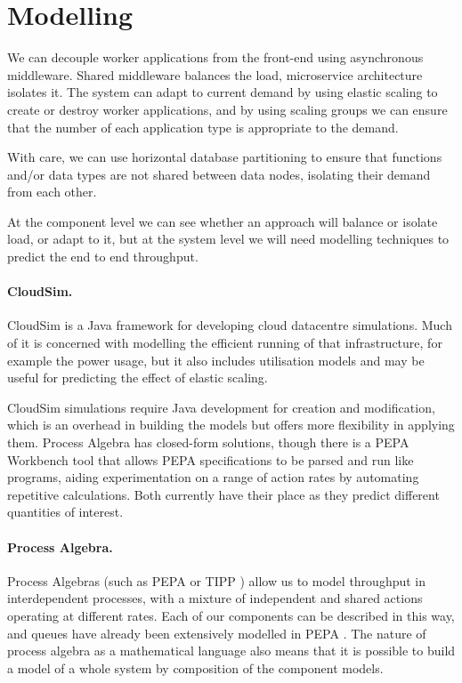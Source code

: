 \section{Modelling}

We can decouple worker applications from the front-end using asynchronous middleware.  Shared middleware balances the load, microservice architecture isolates it.  The system can adapt to current demand by using elastic scaling to create or destroy worker applications, and by using scaling groups we can ensure that the number of each application type is appropriate to the demand.

With care, we can use horizontal database partitioning to ensure that functions and/or data types are not shared between data nodes, isolating their demand from each other.

At the component level we can see whether an approach will balance or isolate load, or adapt to it, but at the system level we will need modelling techniques to predict the end to end throughput.

\paragraph{CloudSim.}  CloudSim \cite{calheiros2011cloudsim} is a Java framework for developing cloud datacentre simulations.  Much of it is concerned with modelling the efficient running of that infrastructure, for example the power usage, but it also includes utilisation models and may be useful for predicting the effect of elastic scaling.

CloudSim simulations require Java development for creation and modification, which is an overhead in building the models but offers more flexibility in applying them.  Process Algebra has closed-form solutions, though there is a PEPA Workbench tool \cite{gilmore1994pepa} that allows PEPA specifications to be parsed and run like programs, aiding experimentation on a range of action rates by automating repetitive calculations.  Both currently have their place as they predict different quantities of interest.

\paragraph{Process Algebra.} Process Algebras (such as PEPA or TIPP \cite{gotz1993multiprocessor}) allow us to model throughput in interdependent processes, with a mixture of independent and shared actions operating at different rates.  Each of our components can be described in this way, and queues have already been extensively modelled in PEPA \cite{thomas1997using}.  The nature of process algebra as a mathematical language also means that it is possible to build a model of a whole system by composition of the component models.

